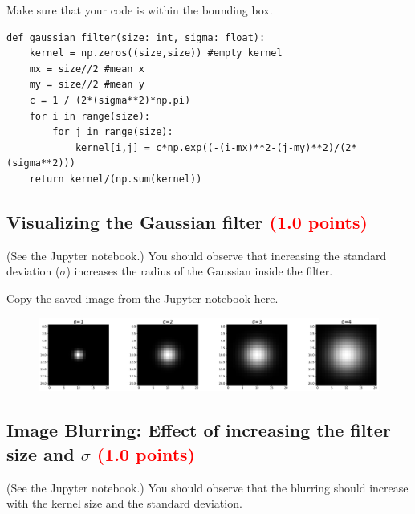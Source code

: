 \documentclass[answers]{exam}
\newcommand{\mypoints}[1]{\textcolor{red}{(#1 points)}}
\begin{document}
Make sure that your code is within the bounding box.
\begin{solution}
\begin{verbatim}
def gaussian_filter(size: int, sigma: float):
    kernel = np.zeros((size,size)) #empty kernel
    mx = size//2 #mean x
    my = size//2 #mean y
    c = 1 / (2*(sigma**2)*np.pi)
    for i in range(size):
        for j in range(size):
            kernel[i,j] = c*np.exp((-(i-mx)**2-(j-my)**2)/(2*(sigma**2)))
    return kernel/(np.sum(kernel))
\end{verbatim}
\end{solution}

\subsection{Visualizing the Gaussian filter \mypoints{1.0}}

(See the Jupyter notebook.) You should observe that increasing the standard deviation ($\sigma$) increases the radius of the Gaussian inside the filter.

Copy the saved image from the Jupyter notebook here.
\begin{solution}
\begin{figure}[H]
    \centering
    \includegraphics[width=1.0\linewidth]{Images/question_3_2.pdf}
\end{figure}
\end{solution}

\subsection{Image Blurring: Effect of increasing the filter size and $\sigma$ \mypoints{1.0}}

(See the Jupyter notebook.) You should observe that the blurring should increase with the kernel size and the standard deviation.
\end{document}
